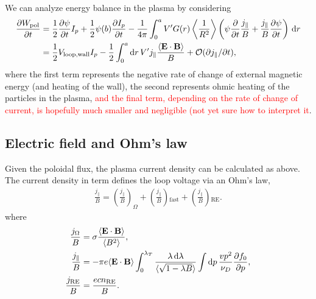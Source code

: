 \documentclass[11pt,a4paper]{article}
\newcommand{\rd}{\ensuremath{\mathrm{d}}}
\newcommand{\Ordo}{\ensuremath{\mathcal{O}}}%
\newcommand{\sub}[1]{\ensuremath{_{\text{#1}}}}
\renewcommand{\b}[1]{\ensuremath{ {\bf #1 } }}
\begin{document}
We can analyze energy balance in the plasma by considering
\begin{align}
\frac{\partial W_\mathrm{pol}}{\partial t} &= \frac{1}{2}\frac{\partial \psi}{\partial t}I_p + \frac{1}{2}\psi(b)\frac{\partial I_p}{\partial t} 
-\frac{1}{4\pi}\int_0^a V' G(r)\left\langle\frac{1}{R^2}\right\rangle \left(\psi\frac{\partial}{\partial t}\frac{j_\parallel}{B} +\frac{j_\parallel}{B}\frac{\partial  \psi }{\partial t}\right) \,\rd r  \nonumber \\
&= \frac{1}{2}V\sub{loop,wall}I_p - \frac{1}{2}\int_0^a \rd r \,V' j_\parallel\frac{\langle \b{E}\cdot\b{B}\rangle}{B} + \Ordo(\partial j_\parallel/\partial t),
\end{align}
where the first term represents the negative rate of change of external magnetic energy (and heating of the wall), the second represents ohmic heating of the particles in the plasma, \textcolor{red}{and the final term, depending on the rate of change of current, is hopefully much smaller and negligible (not yet sure how to interpret it}.

\subsection{Electric field and Ohm's law}
Given the poloidal flux, the plasma current density can be calculated as above. The current density in term defines the loop voltage via an Ohm's law,%
\begin{align}
\frac{j_\parallel}{B} = \left(\frac{j_\parallel}{B}\right)_\Omega + \left(\frac{j_\parallel}{B}\right)\sub{fast} + \left(\frac{j_\parallel}{B}\right)\sub{RE}.
\end{align}
where
\begin{align}
\frac{j_\Omega}{B} &= \sigma \frac{\langle \b{E}\cdot\b{B} \rangle}{\langle B^2\rangle}, \nonumber \\
\frac{j_\parallel}{B} &= -\pi  e\langle \b{E}\cdot\b{B}\rangle \int_0^{\lambda_T}\frac{\lambda\,\rd \lambda}{\langle\sqrt{1-\lambda B}\rangle}\int \rd p \, \frac{vp^2}{\nu_D}\frac{\partial f_0}{\partial p}, \nonumber\\
\frac{j\sub{RE}}{B} &= \frac{ecn\sub{RE}}{B}.
\end{align}
\end{document}
